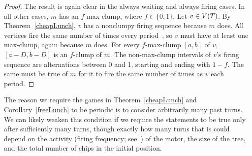 \begin{proof}
The result is again clear in the always waiting and always firing cases. In all
other cases, $m$ has an $f$-max-clump, where $f \in \{0,1\}$. Let $v \in
\V[T]$. By Theorem~\ref{cheapLunch}, $v$ has a nonclumpy firing sequence
because $m$ does. All vertices fire the same number of times every
period~\cite[Proposition~2.5]{jiang}, so $v$ must have at least one max-clump,
again because $m$ does. For every $f$-max-clump $[a, b]$ of $v$, $[a-D, b-D]$
is an $f$-clump of $m$. The non-max-clump intervals of $v$'s firing sequence
are alternations between 0 and 1, starting and ending with $1-f$. The same must
be true of $m$ for it to fire the same number of times as $v$ each period.
\end{proof}

The reason we require the games in Theorem~\ref{cheapLunch} and
Corollary~\ref{freeLunch} to be periodic is to consider arbitrarily many past
turns. We can likely weaken this condition if we require the statements to be
true only after sufficiently many turns, though exactly how many turns that is
could depend on the activity (firing frequency; see~\cite{levine}) of the
motor, the size of the tree, and the total number of chips in the initial
position.
